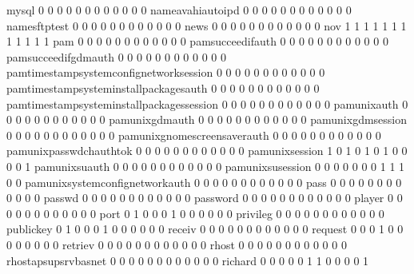 \documentclass[compress,8pt]{beamer}
\begin{document}
\begin{frame}
\begin{Schunk}
  mysql                                     0  0  0  0  0  0  0  0  0  0  0  0
  nameavahiautoipd                          0  0  0  0  0  0  0  0  0  0  0  0
  namesftptest                              0  0  0  0  0  0  0  0  0  0  0  0
  news                                      0  0  0  0  0  0  0  0  0  0  0  0
  nov                                       1  1  1  1  1  1  1  1  1  1  1  1
  pam                                       0  0  0  0  0  0  0  0  0  0  0  0
  pamsucceedifauth                          0  0  0  0  0  0  0  0  0  0  0  0
  pamsucceedifgdmauth                       0  0  0  0  0  0  0  0  0  0  0  0
  pamtimestampsystemconfignetworksession    0  0  0  0  0  0  0  0  0  0  0  0
  pamtimestampsysteminstallpackagesauth     0  0  0  0  0  0  0  0  0  0  0  0
  pamtimestampsysteminstallpackagessession  0  0  0  0  0  0  0  0  0  0  0  0
  pamunixauth                               0  0  0  0  0  0  0  0  0  0  0  0
  pamunixgdmauth                            0  0  0  0  0  0  0  0  0  0  0  0
  pamunixgdmsession                         0  0  0  0  0  0  0  0  0  0  0  0
  pamunixgnomescreensaverauth               0  0  0  0  0  0  0  0  0  0  0  0
  pamunixpasswdchauthtok                    0  0  0  0  0  0  0  0  0  0  0  0
  pamunixsession                            1  0  1  0  1  0  1  0  0  0  0  1
  pamunixsuauth                             0  0  0  0  0  0  0  0  0  0  0  0
  pamunixsusession                          0  0  0  0  0  0  0  1  1  1  0  0
  pamunixsystemconfignetworkauth            0  0  0  0  0  0  0  0  0  0  0  0
  pass                                      0  0  0  0  0  0  0  0  0  0  0  0
  passwd                                    0  0  0  0  0  0  0  0  0  0  0  0
  password                                  0  0  0  0  0  0  0  0  0  0  0  0
  player                                    0  0  0  0  0  0  0  0  0  0  0  0
  port                                      0  1  0  0  0  1  0  0  0  0  0  0
  privileg                                  0  0  0  0  0  0  0  0  0  0  0  0
  publickey                                 0  1  0  0  0  1  0  0  0  0  0  0
  receiv                                    0  0  0  0  0  0  0  0  0  0  0  0
  request                                   0  0  0  1  0  0  0  0  0  0  0  0
  retriev                                   0  0  0  0  0  0  0  0  0  0  0  0
  rhost                                     0  0  0  0  0  0  0  0  0  0  0  0
  rhostapsupsrvbasnet                       0  0  0  0  0  0  0  0  0  0  0  0
  richard                                   0  0  0  0  0  1  1  0  0  0  0  1

\end{Schunk}
\end{frame}
\end{document}
